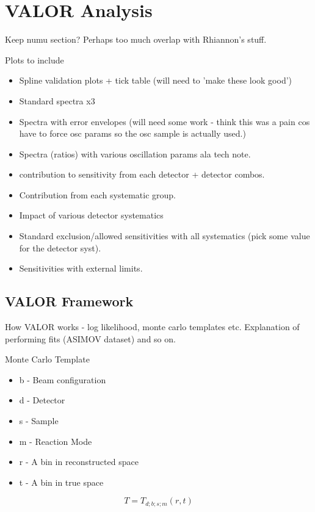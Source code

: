\chapter{VALOR Analysis}
\label{chap:VALOR}

Keep numu section? Perhaps too much overlap with Rhiannon's stuff.

Plots to include
\begin{itemize}
    \item Spline validation plots + tick table (will need to 'make these look good')
    \item Standard spectra x3
    \item Spectra with error envelopes (will need some work - think this was a pain cos have to force osc params so the osc sample is actually used.)
    \item Spectra (ratios) with various oscillation params ala tech note.
    \item contribution to sensitivity from each detector + detector combos.
    \item Contribution from each systematic group.
    \item Impact of various detector systematics 
    \item Standard exclusion/allowed sensitivities with all systematics (pick some value for the detector syst).
    \item Sensitivities with external limits.
\end{itemize}

\section{VALOR Framework}
How VALOR works - log likelihood, monte carlo templates etc. 
Explanation of performing fits (ASIMOV dataset) and so on.

Monte Carlo Template

\begin{itemize}
    \item b - Beam configuration
    \item d - Detector
    \item s - Sample
    \item m - Reaction Mode
    \item r - A bin in reconstructed space
    \item t - A bin in true space
\end{itemize}

\begin{equation}
    T = T_{d;b;s;m}(r, t)
\end{equation}

